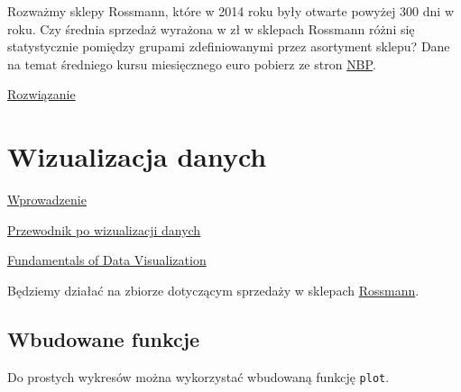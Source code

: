 \documentclass[]{book}
\newenvironment{Shaded}{\begin{snugshade}}{\end{snugshade}}
\newcommand{\KeywordTok}[1]{\textcolor[rgb]{0.13,0.29,0.53}{\textbf{#1}}}
\newcommand{\DataTypeTok}[1]{\textcolor[rgb]{0.13,0.29,0.53}{#1}}
\newcommand{\DecValTok}[1]{\textcolor[rgb]{0.00,0.00,0.81}{#1}}
\newcommand{\StringTok}[1]{\textcolor[rgb]{0.31,0.60,0.02}{#1}}
\newcommand{\CommentTok}[1]{\textcolor[rgb]{0.56,0.35,0.01}{\textit{#1}}}
\newcommand{\OperatorTok}[1]{\textcolor[rgb]{0.81,0.36,0.00}{\textbf{#1}}}
\newcommand{\NormalTok}[1]{#1}
\begin{document}
Rozważmy sklepy Rossmann, które w 2014 roku były otwarte powyżej 300 dni
w roku. Czy średnia sprzedaż wyrażona w zł w sklepach Rossmann różni się
statystycznie pomiędzy grupami zdefiniowanymi przez asortyment sklepu?
Dane na temat średniego kursu miesięcznego euro pobierz ze stron
\href{http://www.nbp.pl/home.aspx?f=/kursy/arch_a.html}{NBP}.

\href{nb/rossmann_analiza.Rmd}{Rozwiązanie}

\chapter{Wizualizacja danych}\label{wizualizacja-danych}

\href{presentations/ggplot2.html}{Wprowadzenie}

\href{https://www.data-to-viz.com/}{Przewodnik po wizualizacji danych}

\href{https://serialmentor.com/dataviz/}{Fundamentals of Data
Visualization}

Będziemy działać na zbiorze dotyczącym sprzedaży w sklepach
\href{data/rossmann.xlsx}{Rossmann}.

\begin{Shaded}
\end{Shaded}

\section{Wbudowane funkcje}\label{wbudowane-funkcje}

Do prostych wykresów można wykorzystać wbudowaną funkcję \texttt{plot}.

\begin{Shaded}
\end{Shaded}
\end{document}
